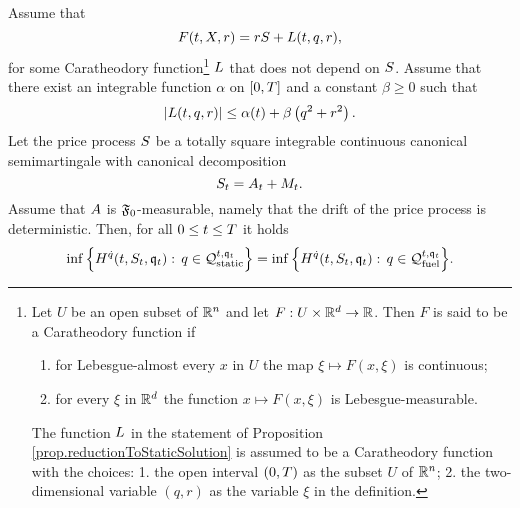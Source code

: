 \documentclass[10pt,a4paper]{article}
\begin{document}
\begin{prop}\label{prop.reductionToStaticSolution}
Assume that 
\begin{equation}\label{eq.decompositionOfLagrangian}
F(t,X,r) = rS + L(t,q,r),
\end{equation}
for some Caratheodory function\footnote{
Let $U$ be an open subset of $\mathbb{R}^{n}$ and let $F:U\times\mathbb{R}^{d} \rightarrow \mathbb{R}$. Then $F$ is said to be a Caratheodory function if
\begin{enumerate}
	\item for Lebesgue-almost every $x$ in $U$ the map $\xi \mapsto F(x,\xi)$ is continuous;
	\item for every $\xi$ in $\mathbb{R}^{d}$ the function $x\mapsto F(x,\xi)$ is Lebesgue-measurable. 
\end{enumerate}
The function $L$ in the statement of Proposition \ref{prop.reductionToStaticSolution} is assumed to be a Caratheodory function with the choices: 1. the open interval $(0,T)$ as the subset $U$ of $\mathbb{R}^{n}$; 2. the two-dimensional variable $(q,r)$ as the variable  $\xi$ in the definition.
}
$L$ that does not depend on $S$. Assume  that there exist an integrable function $\alpha$ on ${[0,T]}$  and a constant $\beta \geq 0$ such that 
\begin{equation*}
\left\lvert {L(t,q,r)} \right\rvert \leq \alpha(t) + \beta \left(q^{2} + r ^{2} \right).
\end{equation*}
Let the price process $S$ be a totally square integrable continuous canonical semimartingale with canonical decomposition  
\begin{equation}\label{eq.evolutionOfFundamentalPrice}
S_t = A_t + M_t.
\end{equation}
Assume that $A$ is $\mathfrak{F}_0$-measurable, namely that the drift of the price process is deterministic. 
Then, for all $0\leq t\leq T$ it holds
\begin{equation*}
\inf \Big\lbrace H^{\dot{q}} (t,S_t,\mathfrak{q}_t) : \, q \in \mathcal{Q}_{\text{static}}^{t,\mathfrak{q}_t} \Big\rbrace
= \inf \Big\lbrace 
H^{\dot{q}} (t,S_t,\mathfrak{q}_t) : \, q \in \mathcal{Q}_{\text{fuel}}^{t,\mathfrak{q}_t} \Big\rbrace.
\end{equation*}
\end{prop}
\end{document}

